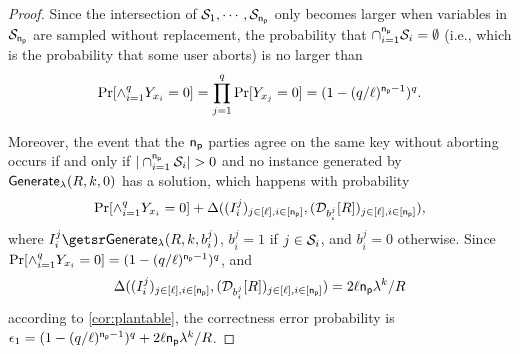 \begin{proof}
Since the intersection of $\mathcal{S}_1,\cdots,\mathcal{S}_{\mathsf{n_p}}$ only becomes larger when variables in $\mathcal{S}_{\mathsf{n_p}}$ are sampled without replacement, the probability that $\cap_{i=1}^{\mathsf{n_p}}\mathcal{S}_i = \emptyset$ (i.e., which is the probability that some user aborts) is no larger than
$$
\Pr[\land_{i=1}^q Y_{x_i}=0] = \prod_{j=1}^{q}\Pr[Y_{x_j}=0]=(1- (q/\ell)^{\mathsf{n_p}-1})^{q}.
$$

Moreover, the event that the $\mathsf{n_p}$ parties agree on the same key without aborting occurs if and only if $|\cap_{i=1}^{\mathsf{n_p}}\mathcal{S}_i| > 0$ and no instance generated by ${\mathsf{Generate}}_\lambda(R,k,0)$ has a solution, which happens with probability
$$\Pr[\land_{i=1}^q Y_{x_i}=0] + \Delta((I^j_i)_{j \in [\ell], i \in [\mathsf{n_p}]}, (\mathcal{D}_{b^j_i}[R])_{j \in [\ell], i \in [\mathsf{n_p}]}),$$ where $\instance^j_i \getsr \Generate(R, k, b^j_i)$, $b^j_i = 1$ if $j \in \mathcal{S}_i$, and $b^j_i = 0$ otherwise. Since 
 $
 \Pr[\land_{i=1}^q Y_{x_i}=0]=(1- (q/\ell)^{\mathsf{n_p}-1})^{q}
 $,
 and
$$\Delta((I^j_i)_{j \in [\ell], i \in [\mathsf{n_p}]}, \allowbreak(\mathcal{D}_{b^j_i}[R])_{j \in [\ell], i \in [\mathsf{n_p}]})=2\ell\mathsf{n_p}\lambda^{k}/R$$ according to \cref{cor:plantable}, the correctness error probability is $\epsilon_1= (1- (q/\ell)^{\mathsf{n_p}-1})^{q} + 2\ell\mathsf{n_p}\lambda^k/R$.
	

\end{proof}

